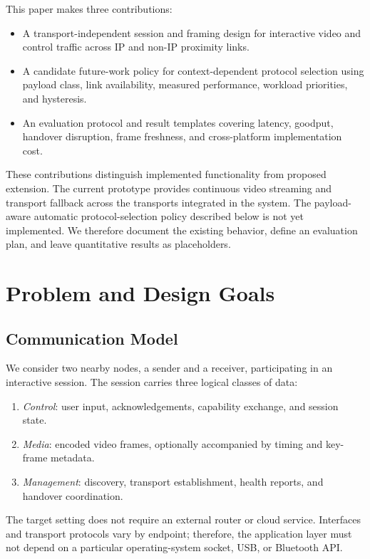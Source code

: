 \documentclass[conference]{IEEEtran}
\begin{document}
This paper makes three contributions:
\begin{itemize}
  \item A transport-independent session and framing design for interactive
  video and control traffic across IP and non-IP proximity links.
  \item A candidate future-work policy for context-dependent protocol
  selection using payload class, link availability, measured performance,
  workload priorities, and hysteresis.
  \item An evaluation protocol and result templates covering latency,
  goodput, handover disruption, frame freshness, and cross-platform
  implementation cost.
\end{itemize}

These contributions distinguish implemented functionality from proposed
extension. The current prototype provides continuous video streaming and
transport fallback across the transports integrated in the system. The
payload-aware automatic protocol-selection policy described below is not yet
implemented. We therefore document the existing behavior, define an
evaluation plan, and leave quantitative results as placeholders.

\section{Problem and Design Goals}
\subsection{Communication Model}
We consider two nearby nodes, a sender and a receiver, participating in an
interactive session. The session carries three logical classes of data:
\begin{enumerate}
  \item \textit{Control}: user input, acknowledgements, capability exchange,
  and session state.
  \item \textit{Media}: encoded video frames, optionally accompanied by
  timing and key-frame metadata.
  \item \textit{Management}: discovery, transport establishment, health
  reports, and handover coordination.
\end{enumerate}
The target setting does not require an external router or cloud service.
Interfaces and transport protocols vary by endpoint; therefore, the
application layer must not depend on a particular operating-system socket,
USB, or Bluetooth API.
\end{document}
